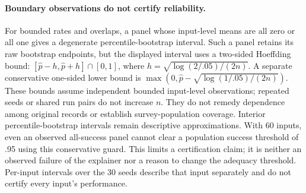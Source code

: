 \paragraph{Boundary observations do not certify reliability.}
For bounded rates and overlaps, a panel whose input-level means are all zero or all one gives a degenerate percentile-bootstrap interval. Such a panel retains its raw bootstrap endpoints, but the displayed interval uses a two-sided Hoeffding bound: $[\widehat p-h,\widehat p+h]\cap[0,1]$, where $h=\sqrt{\log(2/.05)/(2n)}$. A separate conservative one-sided lower bound is $\max(0,\widehat p-\sqrt{\log(1/.05)/(2n)})$. These bounds assume independent bounded input-level observations; repeated seeds or shared run pairs do not increase $n$. They do not remedy dependence among original records or establish survey-population coverage. Interior percentile-bootstrap intervals remain descriptive approximations. With 60 inputs, even an observed all-success panel cannot clear a population success threshold of .95 using this conservative guard. This limits a certification claim; it is neither an observed failure of the explainer nor a reason to change the adequacy threshold. Per-input intervals over the 30 seeds describe that input separately and do not certify every input's performance.
